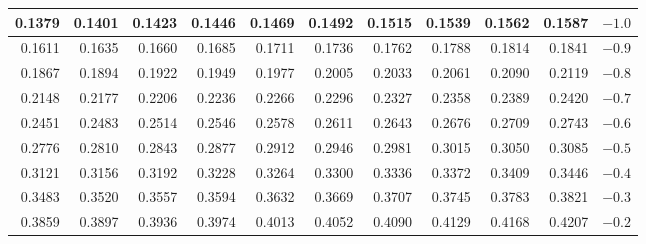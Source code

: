 \begin{table}[p]
\begin{center}
{\begin{tabular}{| rrrrr | rrrrr | c}
  \footnotesize{0.1379} & \footnotesize{0.1401} & \footnotesize{0.1423} & \footnotesize{0.1446} & \footnotesize{0.1469} & \footnotesize{0.1492} & \footnotesize{0.1515} & \footnotesize{0.1539} & \footnotesize{0.1562} & \footnotesize{0.1587} & $-1.0$ \\
    \hline
    \hline
  \footnotesize{0.1611} & \footnotesize{0.1635} & \footnotesize{0.1660} & \footnotesize{0.1685} & \footnotesize{0.1711} & \footnotesize{0.1736} & \footnotesize{0.1762} & \footnotesize{0.1788} & \footnotesize{0.1814} & \footnotesize{0.1841} & $-0.9$ \\
  \footnotesize{0.1867} & \footnotesize{0.1894} & \footnotesize{0.1922} & \footnotesize{0.1949} & \footnotesize{0.1977} & \footnotesize{0.2005} & \footnotesize{0.2033} & \footnotesize{0.2061} & \footnotesize{0.2090} & \footnotesize{0.2119} & $-0.8$ \\
  \footnotesize{0.2148} & \footnotesize{0.2177} & \footnotesize{0.2206} & \footnotesize{0.2236} & \footnotesize{0.2266} & \footnotesize{0.2296} & \footnotesize{0.2327} & \footnotesize{0.2358} & \footnotesize{0.2389} & \footnotesize{0.2420} & $-0.7$ \\
  \footnotesize{0.2451} & \footnotesize{0.2483} & \footnotesize{0.2514} & \footnotesize{0.2546} & \footnotesize{0.2578} & \footnotesize{0.2611} & \footnotesize{0.2643} & \footnotesize{0.2676} & \footnotesize{0.2709} & \footnotesize{0.2743} & $-0.6$ \\
  \footnotesize{0.2776} & \footnotesize{0.2810} & \footnotesize{0.2843} & \footnotesize{0.2877} & \footnotesize{0.2912} & \footnotesize{0.2946} & \footnotesize{0.2981} & \footnotesize{0.3015} & \footnotesize{0.3050} & \footnotesize{0.3085} & $-0.5$ \\
    \hline
  \footnotesize{0.3121} & \footnotesize{0.3156} & \footnotesize{0.3192} & \footnotesize{0.3228} & \footnotesize{0.3264} & \footnotesize{0.3300} & \footnotesize{0.3336} & \footnotesize{0.3372} & \footnotesize{0.3409} & \footnotesize{0.3446} & $-0.4$ \\
  \footnotesize{0.3483} & \footnotesize{0.3520} & \footnotesize{0.3557} & \footnotesize{0.3594} & \footnotesize{0.3632} & \footnotesize{0.3669} & \footnotesize{0.3707} & \footnotesize{0.3745} & \footnotesize{0.3783} & \footnotesize{0.3821} & $-0.3$ \\
  \footnotesize{0.3859} & \footnotesize{0.3897} & \footnotesize{0.3936} & \footnotesize{0.3974} & \footnotesize{0.4013} & \footnotesize{0.4052} & \footnotesize{0.4090} & \footnotesize{0.4129} & \footnotesize{0.4168} & \footnotesize{0.4207} & $-0.2$ \\

\end{tabular}}
\end{center}
\end{table}
